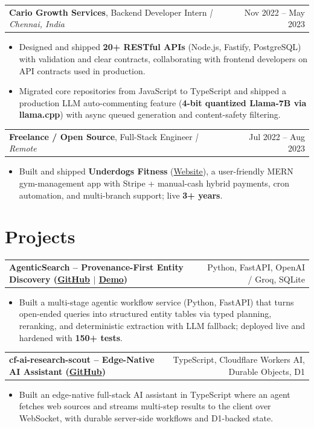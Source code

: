\documentclass[letterpaper,11pt]{article}
\makeatletter
\newcommand{\expItem}[4]{%
  \vspace{3pt}
  \begin{tabular*}{\textwidth}{@{}l@{\extracolsep{\fill}}r@{}}
    \textbf{#1}, #2 \textit{| #3} & #4 \\
  \end{tabular*}\par\vspace{-2pt}
}
\newcommand{\projItem}[2]{%
  \vspace{6pt}
  \begin{tabular*}{\textwidth}{@{}l@{\extracolsep{\fill}}r@{}}
    \textbf{#1} & #2 \\
  \end{tabular*}\par\vspace{-2pt}
}
\makeatother
\begin{document}
\expItem{Cario Growth Services}{Backend Developer Intern}{Chennai, India}{Nov 2022 -- May 2023}
\begin{itemize}
  \item Designed and shipped \textbf{20+ RESTful APIs} (Node.js, Fastify, PostgreSQL) with validation and clear contracts, collaborating with frontend developers on API contracts used in production.
  \item Migrated core repositories from JavaScript to TypeScript and shipped a production LLM auto-commenting feature (\textbf{4-bit quantized Llama-7B via llama.cpp}) with async queued generation and content-safety filtering.
\end{itemize}

\expItem{Freelance / Open Source}{Full-Stack Engineer}{Remote}{Jul 2022 -- Aug 2023}
\begin{itemize}
  \item Built and shipped \textbf{Underdogs Fitness} (\href{https://www.underdogsfitness.in/}{Website}), a user-friendly MERN gym-management app with Stripe + manual-cash hybrid payments, cron automation, and multi-branch support; live \textbf{3+ years}.
\end{itemize}

\section{Projects}

\projItem{AgenticSearch -- Provenance-First Entity Discovery {\normalfont\small(\href{https://github.com/Deva-1903/ciir_agentic_search}{GitHub} $\vert$ \href{https://agentic-search-negglszkwa-uc.a.run.app}{Demo})}}{Python, FastAPI, OpenAI / Groq, SQLite}
\begin{itemize}
  \item Built a multi-stage agentic workflow service (Python, FastAPI) that turns open-ended queries into structured entity tables via typed planning, reranking, and deterministic extraction with LLM fallback; deployed live and hardened with \textbf{150+ tests}.
\end{itemize}

\projItem{cf-ai-research-scout -- Edge-Native AI Assistant {\normalfont\small(\href{https://github.com/Deva-1903/cf_ai_research_scout}{GitHub})}}{TypeScript, Cloudflare Workers AI, Durable Objects, D1}
\begin{itemize}
  \item Built an edge-native full-stack AI assistant in TypeScript where an agent fetches web sources and streams multi-step results to the client over WebSocket, with durable server-side workflows and D1-backed state.
\end{itemize}
\end{document}
